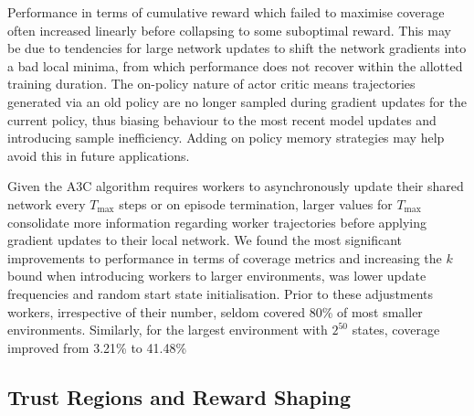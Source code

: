 \documentclass[runningheads]{llncs}
\begin{document}
Performance in terms of cumulative reward which failed to maximise coverage often increased linearly before collapsing to some suboptimal reward. This may be due to tendencies for large network updates to shift the network gradients into a bad local minima, from which performance does not recover within the allotted training duration. The on-policy nature of actor critic means trajectories generated via an old policy are no longer sampled during gradient updates for the current policy, thus biasing behaviour to the most recent model updates and introducing sample inefficiency. Adding on policy memory strategies\cite{wang2017sample} may help avoid this in future applications.

Given the A3C algorithm requires workers to asynchronously update their shared network every $T_{\max}$ steps or on episode termination, larger values for $T_{\max}$ consolidate more information regarding worker trajectories before applying gradient updates to their local network. We found the most significant improvements to performance in terms of coverage metrics and increasing the $k$ bound when introducing workers to larger environments, was lower update frequencies and random start state initialisation. Prior to these adjustments workers, irrespective of their number, seldom covered 80\% of most smaller environments. Similarly, for the largest environment with $2^{50}$ states, coverage improved from 3.21\% to 41.48\%

\subsection{Trust Regions and Reward Shaping} \label{sec:trust_regions}
\end{document}
